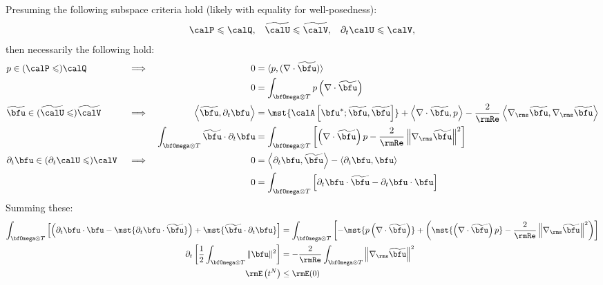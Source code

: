     Presuming the following subspace criteria hold (likely with equality for well-posedness):
    \begin{align}
                    \calP  \leqslant  \calQ,  &&
        \widetilde{\calU}  \leqslant  \widetilde{\calV},  &&
        \partial_{t}\calU  \leqslant  \calV,
    \end{align}
    then necessarily the following hold:
    \begin{align}
        &p                 \in  (\calP              \leqslant)  \calQ              &&\implies  &                                                              0  &=  \langle p, (\nabla\cdot\widetilde{\bfu})\rangle  \\
        &                                                                          &&          &                                                              0  &=  \int_{\bfOmega\otimes T}p\left(\nabla\cdot\widetilde{\bfu}\right)  \\
        &\widetilde{\bfu}  \in  (\widetilde{\calU}  \leqslant)  \widetilde{\calV}  &&\implies  &    \left\langle\widetilde{\bfu}, \partial_{t}\bfu\right\rangle  &=  \mst{\calA\left[\bfu^{*}; \widetilde{\bfu}, \widetilde{\bfu}\right]} + \left\langle\nabla\cdot\widetilde{\bfu}, p\right\rangle - \frac{2}{\rmRe}\left\langle\nabla_{\rms}\widetilde{\bfu}, \nabla_{\rms}\widetilde{\bfu}\right\rangle  \\
        &                                                                          &&          &  \int_{\bfOmega\otimes T}\widetilde{\bfu}\cdot\partial_{t}\bfu  &=  \int_{\bfOmega\otimes T}\left[\left(\nabla\cdot\widetilde{\bfu}\right)p - \frac{2}{\rmRe}\left\|\nabla_{\rms}\widetilde{\bfu}\right\|^{2}\right]  \\
        &\partial_{t}\bfu  \in  (\partial_{t}\calU  \leqslant)  \calV              &&\implies  &                                                              0  &=  \left\langle\partial_{t}\bfu, \widetilde{\bfu}\right\rangle - \left\langle\partial_{t}\bfu, \bfu\right\rangle  \\
        &                                                                          &&          &                                                              0  &=  \int_{\bfOmega\otimes T}\left[\partial_{t}\bfu\cdot\widetilde{\bfu} - \partial_{t}\bfu\cdot\bfu\right]  \\
    \end{align}
    Summing these:
    \begin{align}
        \int_{\bfOmega\otimes T}\left[\left(\partial_{t}\bfu\cdot\bfu - \mst{\partial_{t}\bfu\cdot\widetilde{\bfu}}\right) + \mst{\widetilde{\bfu}\cdot\partial_{t}\bfu}\right]  &=  \int_{\bfOmega\otimes T}\left[- \mst{p\left(\nabla\cdot\widetilde{\bfu}\right)} + \left(\mst{\left(\nabla\cdot\widetilde{\bfu}\right)p} - \frac{2}{\rmRe}\left\|\nabla_{\rms}\widetilde{\bfu}\right\|^{2}\right)\right]  \\
        \partial_{t}\left[\frac{1}{2}\int_{\bfOmega\otimes T}\|\bfu\|^{2}\right]  &=  - \frac{2}{\rmRe}\int_{\bfOmega\otimes T}\left\|\nabla_{\rms}\widetilde{\bfu}\right\|^{2}  \label{eqn:weak NS dissipation}  \\
        \rmE\left(t^{N}\right)  &\leq  \rmE(0)
    \end{align}

